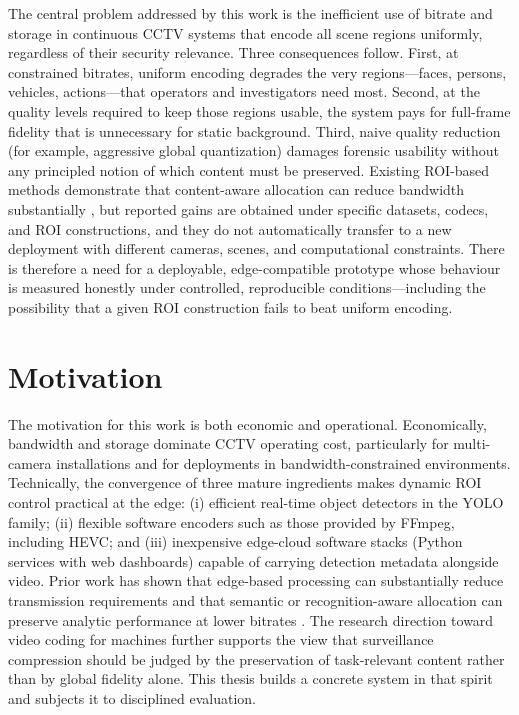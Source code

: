 The central problem addressed by this work is the inefficient use of bitrate and storage in continuous CCTV systems that encode all scene regions uniformly, regardless of their security relevance. Three consequences follow. First, at constrained bitrates, uniform encoding degrades the very regions---faces, persons, vehicles, actions---that operators and investigators need most. Second, at the quality levels required to keep those regions usable, the system pays for full-frame fidelity that is unnecessary for static background. Third, naive quality reduction (for example, aggressive global quantization) damages forensic usability without any principled notion of which content must be preserved. Existing ROI-based methods demonstrate that content-aware allocation can reduce bandwidth substantially \cite{Wu2020FGBG,Wang2023VaBUS}, but reported gains are obtained under specific datasets, codecs, and ROI constructions, and they do not automatically transfer to a new deployment with different cameras, scenes, and computational constraints. There is therefore a need for a deployable, edge-compatible prototype whose behaviour is measured honestly under controlled, reproducible conditions---including the possibility that a given ROI construction fails to beat uniform encoding.

\section{Motivation}

The motivation for this work is both economic and operational. Economically, bandwidth and storage dominate CCTV operating cost, particularly for multi-camera installations and for deployments in bandwidth-constrained environments. Technically, the convergence of three mature ingredients makes dynamic ROI control practical at the edge: (i) efficient real-time object detectors in the YOLO family; (ii) flexible software encoders such as those provided by FFmpeg, including HEVC; and (iii) inexpensive edge-cloud software stacks (Python services with web dashboards) capable of carrying detection metadata alongside video. Prior work has shown that edge-based processing can substantially reduce transmission requirements \cite{Nguyen2020Scalable,Li2022EdgeComp} and that semantic or recognition-aware allocation can preserve analytic performance at lower bitrates \cite{Beye2023Recognition,Elgamal2020SIEVE}. The research direction toward video coding for machines \cite{Duan2020VCM} further supports the view that surveillance compression should be judged by the preservation of task-relevant content rather than by global fidelity alone. This thesis builds a concrete system in that spirit and subjects it to disciplined evaluation.

